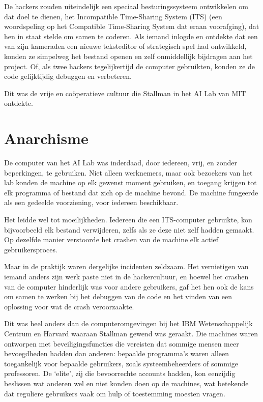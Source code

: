 \documentclass[
  a5paper,
  smalldemyvopaper,11pt,twoside,onecolumn,openright,extrafontsizes]{memoir}
\begin{document}
De hackers zouden uiteindelijk een speciaal besturingssysteem
ontwikkelen om dat doel te dienen, het Incompatible Time-Sharing System
(ITS) (een woordspeling op het Compatible Time-Sharing System dat eraan
voorafging), dat hen in staat stelde om samen te coderen. Als iemand
inlogde en ontdekte dat een van zijn kameraden een nieuwe teksteditor of
strategisch spel had ontwikkeld, konden ze simpelweg het bestand openen
en zelf onmiddellijk bijdragen aan het project. Of, als twee hackers
tegelijkertijd de computer gebruikten, konden ze de code gelijktijdig
debuggen en verbeteren.

Dit was de vrije en coöperatieve cultuur die Stallman in het AI Lab van
MIT ontdekte.

\section{Anarchisme}\label{anarchisme}

De computer van het AI Lab was inderdaad, door iedereen, vrij, en zonder
beperkingen, te gebruiken. Niet alleen werknemers, maar ook bezoekers
van het lab konden de machine op elk gewenst moment gebruiken, en
toegang krijgen tot elk programma of bestand dat zich op de machine
bevond. De machine fungeerde als een gedeelde voorziening, voor iedereen
beschikbaar.

Het leidde wel tot moeilijkheden. Iedereen die een ITS-computer
gebruikte, kon bijvoorbeeld elk bestand verwijderen, zelfs als ze deze
niet zelf hadden gemaakt. Op dezelfde manier verstoorde het crashen van
de machine elk actief gebruikersproces.

Maar in de praktijk waren dergelijke incidenten zeldzaam. Het
vernietigen van iemand anders zijn werk paste niet in de hackercultuur,
en hoewel het crashen van de computer hinderlijk was voor andere
gebruikers, gaf het hen ook de kans om samen te werken bij het debuggen
van de code en het vinden van een oplossing voor wat de crash
veroorzaakte.

Dit was heel anders dan de computeromgevingen bij het IBM
Wetenschappelijk Centrum en Harvard waaraan Stallman gewend was geraakt.
Die machines waren ontworpen met beveiligingsfuncties die vereisten dat
sommige mensen meer bevoegdheden hadden dan anderen: bepaalde
programma's waren alleen toegankelijk voor bepaalde gebruikers, zoals
systeembeheerders of sommige professoren. De `elite', zij die
bevoorrechte accounts hadden, kon eenzijdig beslissen wat anderen wel en
niet konden doen op de machines, wat betekende dat reguliere gebruikers
vaak om hulp of toestemming moesten vragen.
\end{document}
